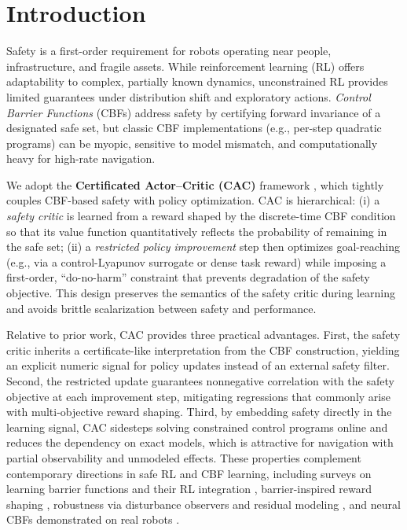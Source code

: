 \documentclass[10pt,conference]{IEEEtran}
\begin{document}
\section{Introduction}
Safety is a first-order requirement for robots operating near people, infrastructure, and fragile assets. While reinforcement learning (RL) offers adaptability to complex, partially known dynamics, unconstrained RL provides limited guarantees under distribution shift and exploratory actions. \emph{Control Barrier Functions} (CBFs) address safety by certifying forward invariance of a designated safe set, but classic CBF implementations (e.g., per-step quadratic programs) can be myopic, sensitive to model mismatch, and computationally heavy for high-rate navigation.

We adopt the \textbf{Certificated Actor--Critic (CAC)} framework \cite{Xie2025CAC}, which tightly couples CBF-based safety with policy optimization. CAC is hierarchical: (i) a \emph{safety critic} is learned from a reward shaped by the discrete-time CBF condition so that its value function quantitatively reflects the probability of remaining in the safe set; (ii) a \emph{restricted policy improvement} step then optimizes goal-reaching (e.g., via a control-Lyapunov surrogate or dense task reward) while imposing a first-order, ``do-no-harm'' constraint that prevents degradation of the safety objective. This design preserves the semantics of the safety critic during learning and avoids brittle scalarization between safety and performance.

Relative to prior work, CAC provides three practical advantages. First, the safety critic inherits a certificate-like interpretation from the CBF construction, yielding an explicit numeric signal for policy updates instead of an external safety filter. Second, the restricted update guarantees nonnegative correlation with the safety objective at each improvement step, mitigating regressions that commonly arise with multi-objective reward shaping. Third, by embedding safety directly in the learning signal, CAC sidesteps solving constrained control programs online and reduces the dependency on exact models, which is attractive for navigation with partial observability and unmodeled effects. These properties complement contemporary directions in safe RL and CBF learning, including surveys on learning barrier functions and their RL integration \cite{Guerrier2024Survey}, barrier-inspired reward shaping \cite{Ranjan2024BarrierShaping}, robustness via disturbance observers and residual modeling \cite{Kalaria2024DOB}, and neural CBFs demonstrated on real robots \cite{Harms2024NeuralCBF}.
\end{document}
